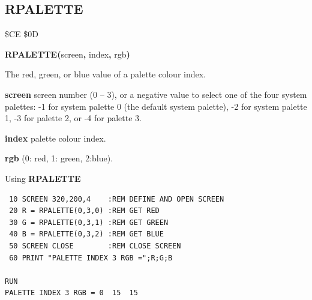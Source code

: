 
\newpage
\subsection{RPALETTE}
\begin{description}[leftmargin=2cm,style=nextline]
\item [Token:] \$CE \$0D
\item [Format:] {\bf RPALETTE(}screen{\bf,} index{\bf,} rgb{\bf)}
\item [Returns:]  The red, green, or blue value of
                a palette colour index.

                {\bf screen} screen number (0 -- 3), or a negative value to
                select one of the four system palettes: -1 for system palette
                0 (the default system palette), -2 for system palette 1,
                -3 for palette 2, or -4 for palette 3.

                {\bf index} palette colour index.

                {\bf rgb} (0: red, 1: green, 2:blue).

\item [Example:] Using {\bf RPALETTE}

\begin{tcolorbox}[colback=black,coltext=white]
\verbatimfont{\codefont}
\begin{verbatim}
 10 SCREEN 320,200,4    :REM DEFINE AND OPEN SCREEN
 20 R = RPALETTE(0,3,0) :REM GET RED
 30 G = RPALETTE(0,3,1) :REM GET GREEN
 40 B = RPALETTE(0,3,2) :REM GET BLUE
 50 SCREEN CLOSE        :REM CLOSE SCREEN
 60 PRINT "PALETTE INDEX 3 RGB =";R;G;B

RUN
PALETTE INDEX 3 RGB = 0  15  15
\end{verbatim}
\end{tcolorbox}
\end{description}


\newpage
